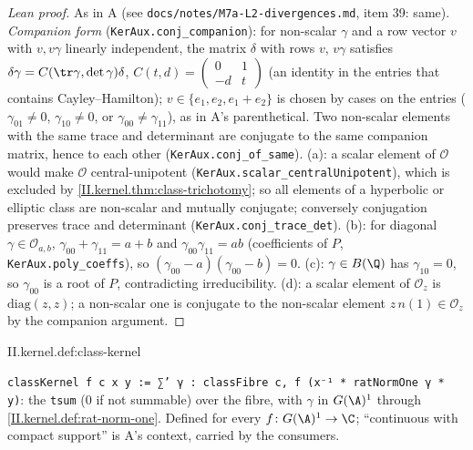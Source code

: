 \begin{proof}[Lean proof]
As in A (see \texttt{docs/notes/M7a-L2-divergences.md}, item 39: same). \emph{Companion form} (\texttt{KerAux.conj\_companion}): for non-scalar $\gamma$ and a row vector $v$ with $v,v\gamma$ linearly independent, the matrix $\delta$ with rows $v$, $v\gamma$ satisfies $\delta\gamma=C(\tr\gamma,\det\gamma)\delta$, $C(t,d)=\left(\begin{smallmatrix}0&1\\-d&t\end{smallmatrix}\right)$ (an identity in the entries that contains Cayley--Hamilton); $v\in\{e_1,e_2,e_1+e_2\}$ is chosen by cases on the entries ($\gamma_{01}\ne0$, $\gamma_{10}\ne0$, or $\gamma_{00}\ne\gamma_{11}$), as in A's parenthetical. Two non-scalar elements with the same trace and determinant are conjugate to the same companion matrix, hence to each other (\texttt{KerAux.conj\_of\_same}). (a): a scalar element of $\mathcal O$ would make $\mathcal O$ central-unipotent (\texttt{KerAux.scalar\_centralUnipotent}), which is excluded by \cref{II.kernel.thm:class-trichotomy}; so all elements of a hyperbolic or elliptic class are non-scalar and mutually conjugate; conversely conjugation preserves trace and determinant (\texttt{KerAux.conj\_trace\_det}). (b): for diagonal $\gamma\in\mathcal O_{a,b}$, $\gamma_{00}+\gamma_{11}=a+b$ and $\gamma_{00}\gamma_{11}=ab$ (coefficients of $P$, \texttt{KerAux.poly\_coeffs}), so $(\gamma_{00}-a)(\gamma_{00}-b)=0$. (c): $\gamma\in B(\Q)$ has $\gamma_{10}=0$, so $\gamma_{00}$ is a root of $P$, contradicting irreducibility. (d): a scalar element of $\mathcal O_z$ is $\mathrm{diag}(z,z)$; a non-scalar one is conjugate to the non-scalar element $z\,n(1)\in\mathcal O_z$ by the companion argument.
\end{proof}

\begin{definition}
\end{definition}
\begin{tfformal}{II.kernel.def:class-kernel}
\begin{tffidelity}
\texttt{classKernel f c x y := ∑' γ : classFibre c, f (x⁻¹ * ratNormOne γ * y)}: the \texttt{tsum} ($0$ if not summable) over the fibre, with $\gamma$ in $G(\A)^1$ through \cref{II.kernel.def:rat-norm-one}. Defined for every $f\colon G(\A)^1\to\C$; ``continuous with compact support'' is A's context, carried by the consumers.
\end{tffidelity}
\end{tfformal}

